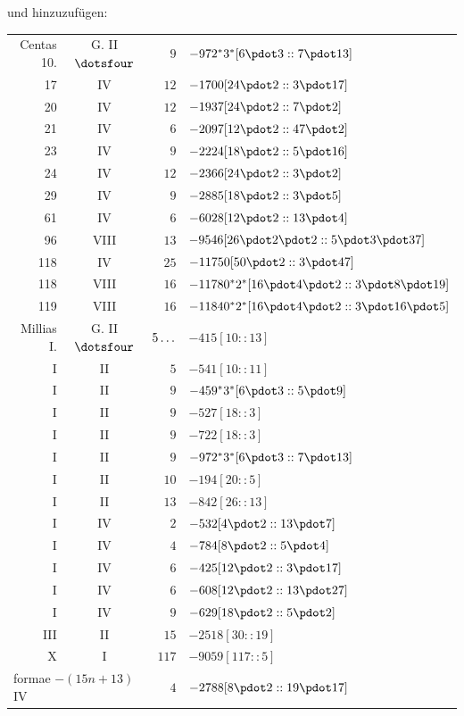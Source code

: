 \par{}und hinzuzufügen:
\begin{longtable}{rcrl}
Centas 10. & G. II $\dotsfour$ & $9$ & $-972{}^{*}3^{*}[6\pdot3::7\pdot13]$ \\
17 & IV & $12$ & $-1700[24\pdot2::3\pdot17]$ \\
20 & IV & $12$ & $-1937[24\pdot2::7\pdot2]$ \\
21 & IV & $6$ & $-2097[12\pdot2::47\pdot2]$ \\
23 & IV & $9$ & $-2224[18\pdot2::5\pdot16]$ \\
24 & IV & $12$ & $-2366[24\pdot2::3\pdot2]$ \\
29 & IV & $9$ & $-2885[18\pdot2::3\pdot5]$ \\
61 & IV & $6$ & $-6028[12\pdot2::13\pdot4]$ \\
96 & VIII & $13$ & $-9546[26\pdot2\pdot2::5\pdot3\pdot37]$ \\
118 & IV & $25$ & $-11750[50\pdot2::3\pdot47]$ \\
118 & VIII & $16$ & $-11780{}^{*}2^{*}[16\pdot4\pdot2::3\pdot8\pdot19]$ \\
119 & VIII & $16$ & $-11840{}^{*}2^{*}[16\pdot4\pdot2::3\pdot16\pdot5]$ \\
Millias I. & G. II $\dotsfour$ & $5\mathinner{.\,.\,.}$ & $-415[10::13]$ \\
I & II & $5$ & $-541[10::11]$ \\
I & II & $9$ & $-459{}^{*}3^{*}[6\pdot3::5\pdot9]$ \\
I & II & $9$ & $-527[18::3]$ \\
I & II & $9$ & $-722[18::3]$ \\
I & II & $9$ & $-972{}^{*}3^{*}[6\pdot3::7\pdot13]$ \\
I & II & $10$ & $-194[20::5]$ \\
I & II & $13$ & $-842[26::13]$ \\
I & IV & $2$ & $-532[4\pdot2::13\pdot7]$ \\
I & IV & $4$ & $-784[8\pdot2::5\pdot4]$ \\
I & IV & $6$ & $-425[12\pdot2::3\pdot17]$ \\
I & IV & $6$ & $-608[12\pdot2::13\pdot27]$ \\
I & IV & $9$ & $-629[18\pdot2::5\pdot2]$ \\
III & II & $15$ & $-2518[30::19]$ \\
X & I & $117$ & $-9059[117::5]$ \\
\multicolumn{2}{l}{formae $-(15n+13)$ IV} & $4$ & $-2788[8\pdot2::19\pdot17]$ \\
\end{longtable}
